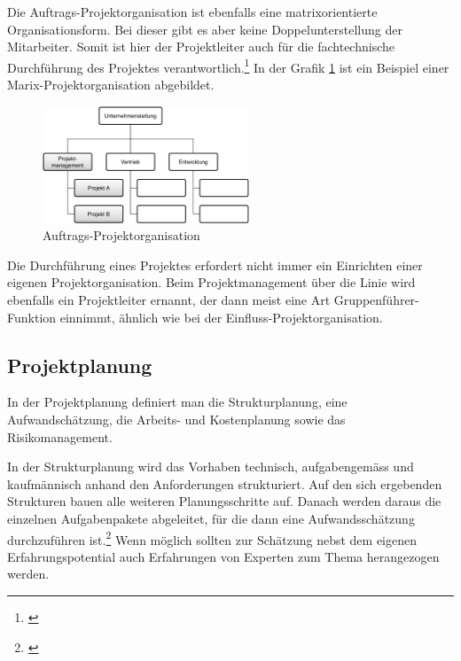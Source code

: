 Die Auftrags-Projektorganisation ist ebenfalls eine matrixorientierte 
Organisationsform. Bei dieser gibt es aber keine Doppelunterstellung der Mitarbeiter.
Somit ist hier der Projektleiter auch für die fachtechnische Durchführung des
Projektes verantwortlich.\footnote{\citealp*[Vgl.][S. 58]{burghardt2007einfuehrung}}
In der Grafik \ref{pic:05_projektorganisationen_auftrags}
ist ein Beispiel einer Marix-Projektorganisation abgebildet.

\clearpage

\begin{figure}[htbp]
\begin{center}
\includegraphics[width=0.55\textwidth,angle=0]{./bilder/theorie/05_projektorganisationen_auftrags.pdf}
\caption[Auftrags-Projektorganisation]{Auftrags-Projektorganisation\footnotemark}
\label{pic:05_projektorganisationen_auftrags}
\end{center}
\end{figure}

Die Durchführung eines Projektes erfordert nicht immer ein Einrichten einer eigenen
Projektorganisation. Beim Projektmanagement über die Linie wird ebenfalls ein
Projektleiter ernannt, der dann meist eine Art Gruppenführer-Funktion einnimmt,
ähnlich wie bei der Einfluss-Projektorganisation.

\subsection{Projektplanung}
In der Projektplanung definiert man die Strukturplanung, eine Aufwandschätzung,
die Arbeits- und Kostenplanung sowie das Risikomanagement.

In der Strukturplanung wird das Vorhaben technisch, aufgabengemäss und kaufmännisch
anhand den Anforderungen strukturiert. Auf den sich ergebenden Strukturen bauen
alle weiteren Planungsschritte auf. Danach werden daraus die einzelnen Aufgabenpakete
abgeleitet, für die dann eine Aufwandsschätzung durchzuführen ist.\footnote{\citealp*[Vgl.][S. 14]{burghardt2007einfuehrung}}
Wenn möglich sollten zur Schätzung nebst dem eigenen Erfahrungspotential auch
Erfahrungen von Experten zum Thema herangezogen werden.

